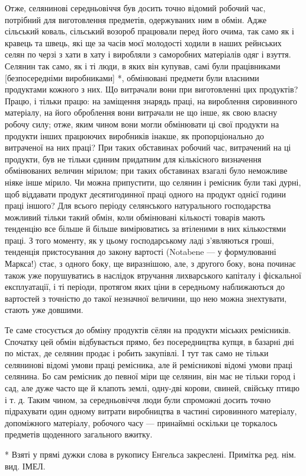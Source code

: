 Отже, селянинові середньовіччя був досить точно відомий робочий час, потрібний для виготовлення предметів, одержуваних ним в
обмін. Адже сільський коваль, сільський возороб працювали перед його очима, так само як і кравець та швець, які ще за часів
моєї молодості ходили в наших рейнських селян по черзі з хати в хату і виробляли з саморобних матеріалів одяг і взуття.
Селянин так само, як і ті люди, в яких він купував, самі були працівниками [безпосередніми виробниками] *, обмінювані
предмети були власними продуктами кожного з них. Що витрачали вони при виготовленні цих продуктів? Працю, і тільки працю: на
заміщення знарядь праці, на вироблення сировинного матеріалу, на його оброблення вони витрачали не що інше, як свою власну
робочу силу; отже, яким чином вони могли обмінювати ці свої продукти на продукти інших працюючих виробників інакше, як
пропорціонально до витраченої на них праці?  При таких обставинах робочий час, витрачений на ці продукти, був не тільки
єдиним придатним для кількісного визначення обмінюваних величин мірилом; при таких обставинах взагалі було неможливе ніяке
інше мірило. Чи можна припустити, що селянин і ремісник були такі дурні, щоб віддавати продукт десятигодинної праці одного
на продукт однієї години праці іншого? Для всього періоду селянського натурального господарства можливий тільки такий
обмін, коли обмінювані кількості товарів мають тенденцію все більше й більше вимірюватись за втіленими в них кількостями
праці. З того моменту, як у цьому господарському ладі з’являються гроші, тенденція пристосування до закону вартості
(Notabene — у формулюванні Маркса!) стає, з одного боку, ще виразнішою, але, з другого боку, вона починає також уже
порушуватись в наслідок втручання лихварського капіталу і фіскальної експлуатації, і ті періоди, протягом яких ціни в
середньому наближаються до вартостей з точністю до такої незначної величини, що нею можна знехтувати, стають уже довшими.

Те саме стосується до обміну продуктів сёлян на продукти міських ремісників. Спочатку цей обмін відбувається прямо, без
посередництва купця, в базарні дні по містах, де селянин продає і робить закупівлі. І тут так само не тільки селянинові
відомі умови праці ремісника, але й ремісникові відомі умови праці селянина. Бо сам ремісник до певної міри ще селянин, він
має не тільки город і сад, але дуже часто ще й клапоть землі, одну-дві корови, свиней, свійську птицю і т. д. Таким чином,
за середньовіччя люди були спроможні досить точно підрахувати один одному витрати виробництва в частині сировинного
матеріалу, допоміжного матеріалу, робочого часу — принаймні оскільки це торкалось предметів щоденного загального вжитку.

* Взяті у прямі дужки слова в рукопису Енгельса закреслені. Примітка ред. нім. вид. ІМЕЛ.
